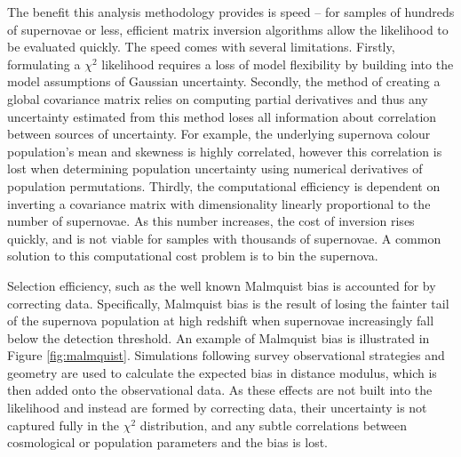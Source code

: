 \documentclass[a4paper,fleqn,usenatbib]{mnras}
\begin{document}
The benefit this analysis methodology provides is speed -- for samples of hundreds of supernovae or less, efficient matrix inversion algorithms allow the likelihood to be evaluated quickly. The speed comes with several limitations. Firstly, formulating a $\chi^2$ likelihood requires a loss of model flexibility by building into the model assumptions of Gaussian uncertainty. Secondly, the method of creating a global covariance matrix relies on computing partial derivatives and thus any uncertainty estimated from this method loses all information about correlation between sources of uncertainty. For example, the underlying supernova colour population's mean and skewness is highly correlated, however this correlation is lost when determining population uncertainty using numerical derivatives of population permutations. Thirdly, the computational efficiency is dependent on inverting a covariance matrix with dimensionality linearly proportional to the number of supernovae. As this number increases, the cost of inversion rises quickly, and is not viable for samples with thousands of supernovae. A common solution to this computational cost problem is to bin the supernova.

Selection efficiency, such as the well known Malmquist bias \citep{MalmquistK.G.1922} is accounted for by correcting data. Specifically, Malmquist bias is the result of losing the fainter tail of the supernova population at high redshift when supernovae increasingly fall below the detection threshold. An example of Malmquist bias is illustrated in Figure \ref{fig:malmquist}. Simulations following survey observational strategies and geometry are used to calculate the expected bias in distance modulus, which is then added onto the observational data. As these effects are not built into the likelihood and instead are formed by correcting data, their uncertainty is not captured fully in the $\chi^2$ distribution, and any subtle correlations between cosmological or population parameters and the bias is lost.
\end{document}
